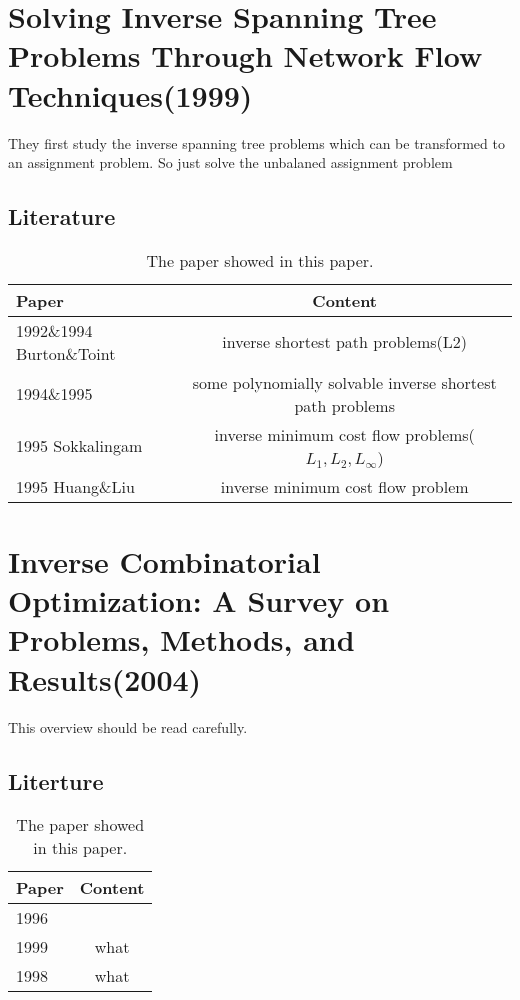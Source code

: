 \documentclass[UTF8]{article}
\begin{document}
\section{Solving Inverse Spanning Tree Problems Through Network Flow Techniques(1999)}

They ﬁrst study the inverse spanning tree problems which can be transformed to an assignment problem. So just solve the unbalaned assignment problem


\subsection{Literature}


\begin{table}[ht]

\tabcolsep=70pt

\small\renewcommand{}

\caption{The paper showed in this paper.\label{tab:2}}

{\begin{tabular}{lc}
\hline
Paper & Content \\
\hline
1992\&1994 Burton\&Toint & inverse shortest path problems(L2) \\
\hline
1994\&1995 & some polynomially solvable inverse shortest path problems \\
\hline
1995 Sokkalingam & inverse minimum cost flow problems($L_1,L_2,L_\infty $) \\
\hline
1995 Huang\&Liu & inverse minimum cost flow problem \\
\hline

\end{tabular}}
{}
\end{table}


\section{Inverse Combinatorial Optimization: A Survey on Problems, Methods, and Results(2004)}

This overview should be read carefully.

\subsection{Literture}


\begin{table}[ht]

\tabcolsep=70pt

\small\renewcommand{}

\caption{The paper showed in this paper.\label{tab:3}}

{\begin{tabular}{lc}
\hline
Paper & Content \\
\hline
1996 &  \\
\hline
1999 & what \\
\hline
1998 & what \\
\hline
\end{tabular}}
{}
\end{table}
\end{document}

